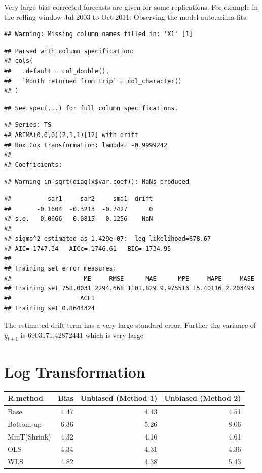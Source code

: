 \documentclass[]{article}
\begin{document}
Very large bias corrected forecasts are given for some replications. For
example in the rolling window Jul-2003 to Oct-2011. Observing the model
auto.arima fits:

\begin{verbatim}
## Warning: Missing column names filled in: 'X1' [1]
\end{verbatim}

\begin{verbatim}
## Parsed with column specification:
## cols(
##   .default = col_double(),
##   `Month returned from trip` = col_character()
## )
\end{verbatim}

\begin{verbatim}
## See spec(...) for full column specifications.
\end{verbatim}

\begin{verbatim}
## Series: TS 
## ARIMA(0,0,0)(2,1,1)[12] with drift 
## Box Cox transformation: lambda= -0.9999242 
## 
## Coefficients:
\end{verbatim}

\begin{verbatim}
## Warning in sqrt(diag(x$var.coef)): NaNs produced
\end{verbatim}

\begin{verbatim}
##          sar1     sar2     sma1  drift
##       -0.1604  -0.3213  -0.7427      0
## s.e.   0.0666   0.0815   0.1256    NaN
## 
## sigma^2 estimated as 1.429e-07:  log likelihood=878.67
## AIC=-1747.34   AICc=-1746.61   BIC=-1734.95
## 
## Training set error measures:
##                    ME     RMSE      MAE      MPE     MAPE     MASE
## Training set 758.0031 2294.668 1101.829 9.975516 15.40116 2.203493
##                   ACF1
## Training set 0.8644324
\end{verbatim}

The estimated drift term has a very large standard error. Further the
variance of \(\hat{y}_{t+1}\) is 6903171.42872441 which is very large

\section{Log Transformation}\label{log-transformation}

\begin{tabular}{l|r|r|r}
\hline
R.method & Bias & Unbiased (Method 1) & Unbiased (Method 2)\\
\hline
Base & 4.47 & 4.43 & 4.51\\
\hline
Bottom-up & 6.36 & 5.26 & 8.06\\
\hline
MinT(Shrink) & 4.32 & 4.16 & 4.61\\
\hline
OLS & 4.34 & 4.31 & 4.36\\
\hline
WLS & 4.82 & 4.38 & 5.43\\
\hline
\end{tabular}
\end{document}
